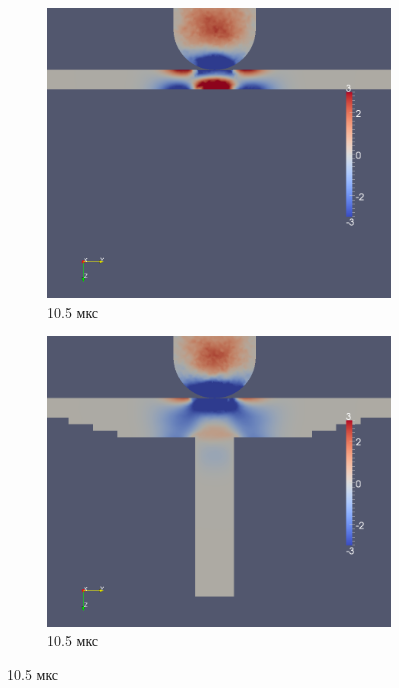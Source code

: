 \begin{figure}[H]
\begin{subfigure}[b]{0.5\textwidth}
\centering
\includegraphics[width=\textwidth]{png/pkm-experiment/wing-only/wave/syy-0009.png}
\caption{10.5 мкс}
\end{subfigure}
\begin{subfigure}[b]{0.5\textwidth}
\centering
\includegraphics[width=\textwidth]{png/pkm-experiment/wing-stringer/wave/syy-0009.png}
\caption{10.5 мкс}
\end{subfigure}

\end{figure}
